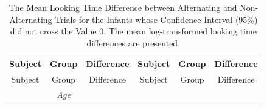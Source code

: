\documentclass[openright,titlepage,12pt,a4paper]{book}
\begin{document}
\begin{longtable}[]{@{}cccccc@{}}
\caption{\label{tab:ch04tab4} The Mean Looking Time Difference between Alternating and Non-Alternating Trials for the Infants whose Confidence Interval (95\%) did not cross the Value 0. The mean log-transformed looking time differences are presented.}\tabularnewline
\toprule
\begin{minipage}[b]{0.11\columnwidth}\centering
Subject\strut
\end{minipage} & \begin{minipage}[b]{0.09\columnwidth}\centering
Group\strut
\end{minipage} & \begin{minipage}[b]{0.18\columnwidth}\centering
Difference\strut
\end{minipage} & \begin{minipage}[b]{0.11\columnwidth}\centering
Subject\strut
\end{minipage} & \begin{minipage}[b]{0.11\columnwidth}\centering
Group\strut
\end{minipage} & \begin{minipage}[b]{0.21\columnwidth}\centering
Difference\strut
\end{minipage}\tabularnewline
\midrule
\endfirsthead
\toprule
\begin{minipage}[b]{0.11\columnwidth}\centering
Subject\strut
\end{minipage} & \begin{minipage}[b]{0.09\columnwidth}\centering
Group\strut
\end{minipage} & \begin{minipage}[b]{0.18\columnwidth}\centering
Difference\strut
\end{minipage} & \begin{minipage}[b]{0.11\columnwidth}\centering
Subject\strut
\end{minipage} & \begin{minipage}[b]{0.11\columnwidth}\centering
Group\strut
\end{minipage} & \begin{minipage}[b]{0.21\columnwidth}\centering
Difference\strut
\end{minipage}\tabularnewline
\midrule
\endhead
\begin{minipage}[t]{0.11\columnwidth}\centering
\strut
\end{minipage} & \begin{minipage}[t]{0.09\columnwidth}\centering
\emph{Age}\strut
\end{minipage} & \begin{minipage}[t]{0.18\columnwidth}\centering

\end{minipage}
\end{longtable}
\end{document}
